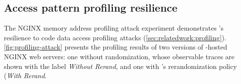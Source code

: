 



















\subsection{Access pattern profiling resilience }
\label{subsec:profiling-attack}
The NGINX memory address profiling attack experiment demonstrates \thename's resilience to code data access profiling attacks (\cref{sec:relatedwork:profiling}).
\autoref{fig:profiling-attack} presents the profiling results of two versions of \thename-hosted NGINX web servers: one without randomization, whose observable traces are shown with the label {\emph{Without Rerand}}, and one with \thename's rerandomization policy (\emph{With Rerand}.

